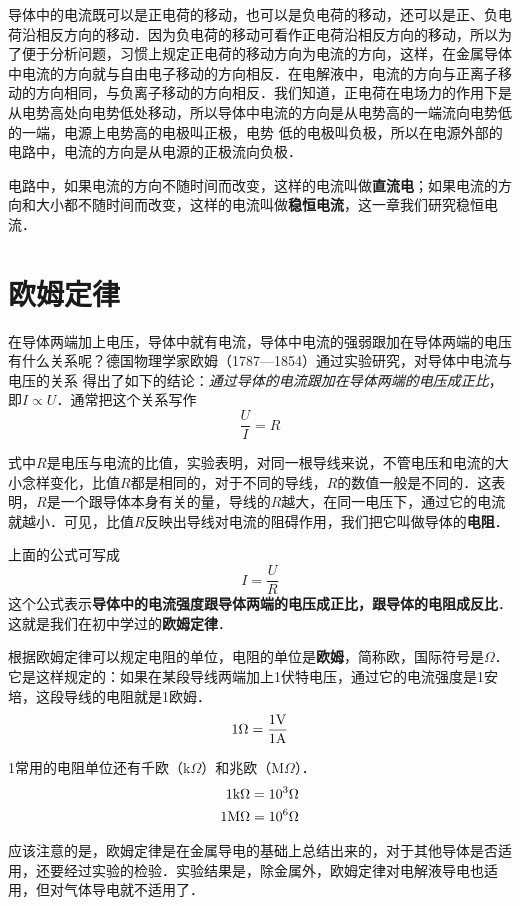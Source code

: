 导体中的电流既可以是正电荷的移动，也可以是负电荷的移动，还可以是正、负电荷沿相反方向的移动．因为负电荷的移动可看作正电荷沿相反方向的移动，所以为了便于分析问题，习惯上规定正电荷的移动方向为电流的方向，这样，在金属导体中电流的方向就与自由电子移动的方向相反．在电解液中，电流的方向与正离子移动的方向相同，与负离子移动的方向相反．我们知道，正电荷在电场力的作用下是从电势高处向电势低处移动，所以导体中电流的方向是从电势高的一端流向电势低的一端，电源上电势高的电极叫正极，电势
低的电极叫负极，所以在电源外部的电路中，电流的方向是从电源的正极流向负极．

电路中，如果电流的方向不随时间而改变，这样的电流叫做\textbf{直流电}；如果电流的方向和大小都不随时间而改变，这样的电流叫做\textbf{稳恒电流}，这一章我们研究稳恒电流．

\section{欧姆定律}
在导体两端加上电压，导体中就有电流，导体中电流的强弱跟加在导体两端的电压有什么关系呢？德国物理学家欧姆（1787—1854）通过实验研究，对导体中电流与电压的关系
得出了如下的结论：\textit{通过导体的电流跟加在导体两端的电压成正比}，即$I\propto U$．通常把这个关系写作
\[\frac{U}{I}=R\]

式中$R$是电压与电流的比值，实验表明，对同一根导线来说，不管电压和电流的大小念样变化，比值$R$都是相同的，对于不同的导线，$R$的数值一般是不同的．这表明，$R$是一个跟导体本身有关的量，导线的$R$越大，在同一电压下，通过它的电流就越小．可见，比值$R$反映出导线对电流的阻碍作用，我们把它叫做导体的\textbf{电阻}．

上面的公式可写成
\[I=\frac{U}{R}\]
这个公式表示\textbf{导体中的电流强度跟导体两端的电压成正比，跟导体的电阻成反比}．这就是我们在初中学过的\textbf{欧姆定律}．

根据欧姆定律可以规定电阻的单位，电阻的单位是\textbf{欧姆}，简称欧，国际符号是$\Omega$． 它是这样规定的：如果在某段导线两端加上1伏特电压，通过它的电流强度是1安培，这段导线的电阻就是1欧姆．
\[1\Omega=\frac{1{\rm V}}{1{\rm A}} \]

1常用的电阻单位还有千欧（k$\Omega$）和兆欧（M$\Omega$）．
\[\begin{split}
    1{\rm k}\Omega&= 10^{3}\Omega\\
    1{\rm M}\Omega&=10^{6}\Omega
\end{split}\]

应该注意的是，欧姆定律是在金属导电的基础上总结出来的，对于其他导体是否适用，还要经过实验的检验．实验结果是，除金属外，欧姆定律对电解液导电也适用，但对气体导电就不适用了．

